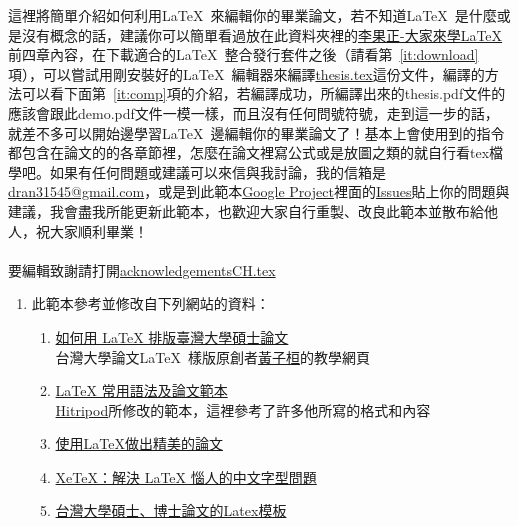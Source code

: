 \begin{acknowledgementsCH}
    這裡將簡單介紹如何利用\LaTeX\ 來編輯你的畢業論文，若不知道\LaTeX\ 是什麼或是沒有概念的話，建議你可以簡單看過放在此資料夾裡的\href{run:./latex123.pdf}{李果正-大家來學\LaTeX}前四章內容，在下載適合的\LaTeX\ 整合發行套件之後（請看第~\ref{it:download}項），可以嘗試用剛安裝好的\LaTeX\ 編輯器來編譯\href{run:./thesis.tex}{thesis.tex}這份文件，編譯的方法可以看下面第~\ref{it:comp}項的介紹，若編譯成功，所編譯出來的thesis.pdf文件的應該會跟此demo.pdf文件一模一樣，而且沒有任何問號符號，走到這一步的話，就差不多可以開始邊學習\LaTeX\ 邊編輯你的畢業論文了！基本上會使用到的指令都包含在論文的的各章節裡，怎麼在論文裡寫公式或是放圖之類的就自行看tex檔學吧。如果有任何問題或建議可以來信與我討論，我的信箱是\href{mailto:dran31545@gmail.com}{dran31545@gmail.com}，或是到此範本\href{http://code.google.com/p/ntu-thesis-latex-template/}{Google Project}裡面的\href{http://code.google.com/p/ntu-thesis-latex-template/issues/list}{Issues}貼上你的問題與建議，我會盡我所能更新此範本，也歡迎大家自行重製、改良此範本並散布給他人，祝大家順利畢業！\\\\
    要編輯致謝請打開\href{run:./acknowledgementsCH.tex}{acknowledgementsCH.tex}\\
    \begin{enumerate}[leftmargin=0pt, topsep=0pt, itemsep=0pt, label=\Roman{*}.]
   \item 此範本參考並修改自下列網站的資料：
   \begin{enumerate}[topsep=0pt, itemsep=0pt, label=$\bullet$]
       \item \href{http://www.csie.ntu.edu.tw/~tzhuan/www/resources/ntu/}{如何用 LaTeX 排版臺灣大學碩士論文}\\
       \textemdash 台灣大學論文\LaTeX\ 樣版原創者\href{http://www.csie.ntu.edu.tw/~tzhuan/www/}{黃子桓}的教學網頁
       \item \href{http://www.hitripod.com/blog/2012/05/latex-thesis-template-quick-reference/}{LaTeX 常用語法及論文範本}\\
       \textemdash \href{http://www.hitripod.com/blog/}{Hitripod}所修改的範本，這裡參考了許多他所寫的格式和內容
       \item \href{http://www.cc.ntu.edu.tw/chinese/epaper/0014/20100920_1404.htm}{使用LaTeX做出精美的論文}
       \item \href{http://www.hitripod.com/blog/2011/04/xetex-chinese-font-cjk-latex/}{XeTeX：解決 LaTeX 惱人的中文字型問題}
       \item \href{http://code.google.com/p/ntuthesis/}{台灣大學碩士、博士論文的Latex模板}\\

\end{enumerate}
\end{enumerate}
\end{acknowledgementsCH}

